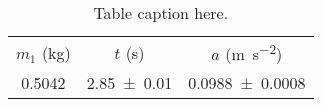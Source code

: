 \begin{table}
\caption{\label{tab:newtable1} Table caption here.}
\begin{center}
\begin{ruledtabular}
\begin{tabular}{ccc}
$m_1$ (\unit{\kilo\gram}) & $t$ (\unit{\second}) & $a$ (\unit{\meter\per\second\squared}) \\ 
\colrule
\num{0.5042} & \num{2.85\pm0.01} & \num{0.0988\pm0.0008} \\ 
\end{tabular}
\end{ruledtabular}
\end{center}
\end{table}
